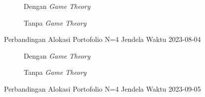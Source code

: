 %         
% 
% 
%         
% 
% 

\begin{figure}[!htbp]
    \centering
    \begin{subfigure}[b]{0.48\textwidth}
        \centering
        


        \caption{Dengan \textit{Game Theory}}
    \end{subfigure}
    \hfill
    \begin{subfigure}[b]{0.48\textwidth}
        \centering
        


        \caption{Tanpa \textit{Game Theory}}
    \end{subfigure}
    \caption{Perbandingan Alokasi Portofolio N=4 Jendela Waktu 2023-08-04}
    \label{fig:window_n4_2023_08_04}
\end{figure}

\begin{figure}[!htbp]
    \centering
    \begin{subfigure}[b]{0.48\textwidth}
        \centering
        


        \caption{Dengan \textit{Game Theory}}
    \end{subfigure}
    \hfill
    \begin{subfigure}[b]{0.48\textwidth}
        \centering
        


        \caption{Tanpa \textit{Game Theory}}
    \end{subfigure}
    \caption{Perbandingan Alokasi Portofolio N=4 Jendela Waktu 2023-09-05}
    \label{fig:window_n4_2023_09_05}
\end{figure}

